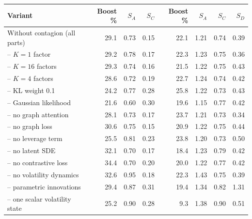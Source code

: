 \begin{tabular}{lrrrrrrr}
\toprule
Variant & Boost \% & $S_A$ & $S_C$ & Boost \% & $S_A$ & $S_C$ & $S_D$ \\
\midrule
Without contagion (all parts) & 29.1 & 0.73 & 0.15 & 22.1 & 1.21 & 0.74 & 0.39 \\
-- $K=1$ factor & 29.2 & 0.78 & 0.17 & 22.3 & 1.23 & 0.75 & 0.36 \\
-- $K=16$ factors & 29.3 & 0.74 & 0.16 & 21.5 & 1.22 & 0.75 & 0.43 \\
-- $K=4$ factors & 28.6 & 0.72 & 0.19 & 22.7 & 1.24 & 0.74 & 0.42 \\
-- KL weight 0.1 & 24.2 & 0.77 & 0.28 & 25.8 & 1.22 & 0.73 & 0.43 \\
-- Gaussian likelihood & 21.6 & 0.60 & 0.30 & 19.6 & 1.15 & 0.77 & 0.42 \\
-- no graph attention & 28.1 & 0.73 & 0.17 & 23.7 & 1.21 & 0.73 & 0.34 \\
-- no graph loss & 30.6 & 0.75 & 0.15 & 20.9 & 1.22 & 0.75 & 0.44 \\
-- no leverage term & 25.5 & 0.81 & 0.23 & 23.8 & 1.20 & 0.73 & 0.50 \\
-- no latent SDE & 32.1 & 0.70 & 0.17 & 18.4 & 1.23 & 0.79 & 0.42 \\
-- no contrastive loss & 34.4 & 0.70 & 0.20 & 20.0 & 1.22 & 0.77 & 0.42 \\
-- no volatility dynamics & 32.6 & 0.95 & 0.18 & 22.3 & 1.43 & 0.75 & 0.39 \\
-- parametric innovations & 29.4 & 0.87 & 0.31 & 19.4 & 1.34 & 0.82 & 1.31 \\
-- one scalar volatility state & 25.2 & 0.90 & 0.28 & 9.3 & 1.38 & 0.90 & 0.51 \\
\bottomrule
\end{tabular}
